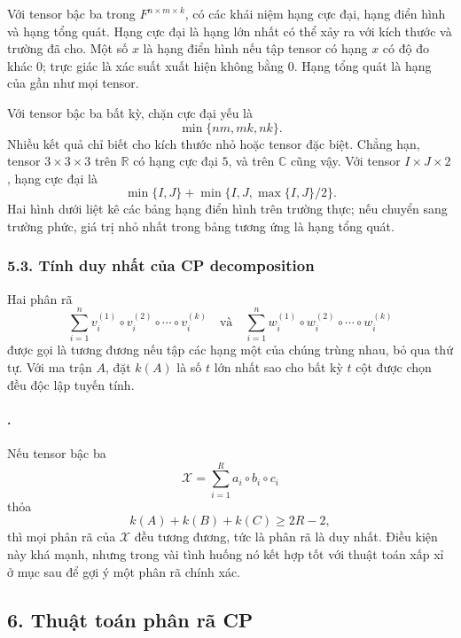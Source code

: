 \documentclass[11pt]{article}
\begin{document}
Với tensor bậc ba trong \(F^{n\times m\times k}\), có các khái niệm hạng cực
đại, hạng điển hình và hạng tổng quát. Hạng cực đại là hạng lớn nhất có thể
xảy ra với kích thước và trường đã cho. Một số \(x\) là hạng điển hình nếu
tập tensor có hạng \(x\) có độ đo khác \(0\); trực giác là xác suất xuất hiện
không bằng \(0\). Hạng tổng quát là hạng của gần như mọi tensor.

Với tensor bậc ba bất kỳ, chặn cực đại yếu là
\[
  \min\{nm,mk,nk\}.
\]
Nhiều kết quả chỉ biết cho kích thước nhỏ hoặc tensor đặc biệt. Chẳng hạn,
tensor \(3\times 3\times 3\) trên \(\mathbb R\) có hạng cực đại \(5\), và trên
\(\mathbb C\) cũng vậy. Với tensor \(I\times J\times 2\), hạng cực đại là
\[
  \min\{I,J\}+\min\{I,J,\max\{I,J\}/2\}.
\]
Hai hình dưới liệt kê các bảng hạng điển hình trên trường thực; nếu chuyển sang
trường phức, giá trị nhỏ nhất trong bảng tương ứng là hạng tổng quát.


\subsubsection*{5.3. Tính duy nhất của CP decomposition}

Hai phân rã
\[
  \sum_{i=1}^{n}v_i^{(1)}\circ v_i^{(2)}\circ\cdots\circ v_i^{(k)}
  \quad\text{và}\quad
  \sum_{i=1}^{n}w_i^{(1)}\circ w_i^{(2)}\circ\cdots\circ w_i^{(k)}
\]
được gọi là tương đương nếu tập các hạng một của chúng trùng nhau, bỏ qua thứ
tự. Với ma trận \(A\), đặt \(k(A)\) là số \(t\) lớn nhất sao cho bất kỳ \(t\)
cột được chọn đều độc lập tuyến tính.

\paragraph{.}
Nếu tensor bậc ba
\[
  \mathcal X=\sum_{i=1}^{R}a_i\circ b_i\circ c_i
\]
thỏa
\[
  k(A)+k(B)+k(C)\ge 2R-2,
\]
thì mọi phân rã của \(\mathcal X\) đều tương đương, tức là phân rã là duy
nhất. Điều kiện này khá mạnh, nhưng trong vài tình huống nó kết hợp tốt với
thuật toán xấp xỉ ở mục sau để gợi ý một phân rã chính xác.

\subsection*{6. Thuật toán phân rã CP}
\end{document}
